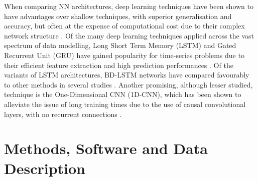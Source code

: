 \documentclass[mstat,12pt]{unswthesis}
\begin{document}
When comparing NN architectures, deep learning techniques have been shown to have advantages over shallow techniques, with superior generalisation and accuracy, but often at the expense of computational cost due to their complex network structure \cite{Dong2021}. Of the many deep learning techniques applied across the vast spectrum of data modelling, Long Short Term Memory (LSTM) and Gated Recurrent Unit (GRU) have gained popularity for time-series problems due to their efficient feature extraction and high prediction performances \cite{Yazici2022}. Of the variants of LSTM architectures, BD-LSTM networks have compared favourably to other methods in several studies \cite{Chandra2021}\cite{Wang2019}. Another promising, although lesser studied, technique is the One-Dimensional CNN (1D-CNN), which has been shown to alleviate the issue of long training times due to the use of causal convolutional layers, with no recurrent connections \cite{Yazici2022}.
 
\hypertarget{methods-software-and-data-description}{
    \section{Methods, Software and Data Description}
    \label{methods-software-and-data-description}
}
\end{document}
